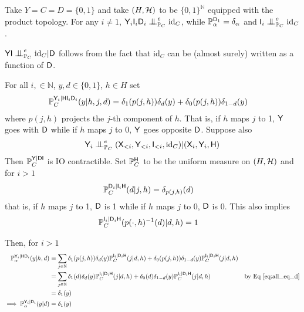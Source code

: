 \begin{example}
Take $Y=C=D=\{0,1\}$ and take $(H,\mathcal{H})$ to be $\{0,1\}^{\mathbb{N}}$ equipped with the product topology. For any $i\neq 1$, $\RV{Y}_i\RV{I}_i\RV{D}_i\CI^e_{\prob{P}_C} \text{id}_C$, while $\mathbb{P}_\alpha^{\mathsf{D}_1}=\delta_\alpha$ and $\RV{I}_i\CI^e_{\prob{P}_C} \text{id}_C$.

$\RV{YI}\CI^e_{\prob{P}_C} \text{id}_C|\RV{D}$ follows from the fact that $\text{id}_C$ can be (almost surely) written as a function of $\mathsf{D}$.

For all $i,\in \mathbb{N}$, $y,d\in \{0,1\}$, $h\in H$ set
\begin{align}
    \mathbb{P}_C^{\mathsf{Y}_i|\mathsf{H}\mathsf{I}_i\mathsf{D}_i}(y|h,j,d) &= \delta_1(p(j,h))\delta_d(y) + \delta_0(p(j,h))\delta_{1-d}(y)
\end{align}
where $p(j,h)$ projects the $j$-th component of $h$. That is, if $h$ maps $j$ to 1, $\mathsf{Y}$ goes with $\mathsf{D}$ while if $h$ maps $j$ to $0$, $\mathsf{Y}$ goes opposite $\mathsf{D}$. Suppose also 
\begin{align}
    \RV{Y}_i\CI_{\prob{P}_C}^e (\RV{X}_{<i},\RV{Y}_{<i},\RV{I}_{<i},\text{id}_C)|(\RV{X}_i,\RV{Y}_i,\RV{H})
\end{align}
Then $\mathbb{P}_C^{\mathsf{Y}|\mathsf{DI}}$ is IO contractible. Set $\mathbb{P}_{C}^{\mathsf{H}}$ to be the uniform measure on $(H,\mathcal{H})$ and for $i>1$
\begin{align}
    \mathbb{P}_C^{\mathsf{D}_i|\mathsf{I}_i\mathsf{H}}(d|j,h) &= \delta_{p(j,h)}(d)
\end{align}
that is, if $h$ maps $j$ to 1, $\mathsf{D}$ is 1 while if $h$ maps $j$ to $0$, $\mathsf{D}$ is 0. This also implies
\begin{align}
    \mathbb{P}_C^{\mathsf{I}_i|\mathsf{D}_i\mathsf{H}}(p(\cdot,h)^{-1}(d)|d,h) &= 1\label{eq:all_eq_d}
\end{align}

Then, for $i>1$
\begin{align}
    \mathbb{P}_\alpha^{\mathsf{Y}_i|\mathsf{H}\mathsf{D}_i}(y|h,d) &= \sum_{j\in \mathbb{N}} \delta_1(p(j,h))\delta_d(y)\mathbb{P}_C^{\mathsf{I}_i|\mathsf{D}_i\mathsf{H}}(j|d,h) + \delta_0(p(j,h))\delta_{1-d}(y)\mathbb{P}_C^{\mathsf{I}_i|\mathsf{D}_i\mathsf{H}}(j|d,h)\\
    &= \sum_{j\in \mathbb{N}} \delta_1(d)\delta_d(y)\mathbb{P}_C^{\mathsf{I}_i|\mathsf{D}_i\mathsf{H}}(j|d,h) + \delta_0(d)\delta_{1-d}(y)\mathbb{P}_C^{\mathsf{I}_i|\mathsf{D}_i\mathsf{H}}(j|d,h)&\text{by Eq \eqref{eq:all_eq_d}}\\
    &= \delta_1(y)\\
    \implies \mathbb{P}_\alpha^{\mathsf{Y}_i|\mathsf{D}_i}(y|d) &= \delta_1(y)
\end{align}


\end{example}
